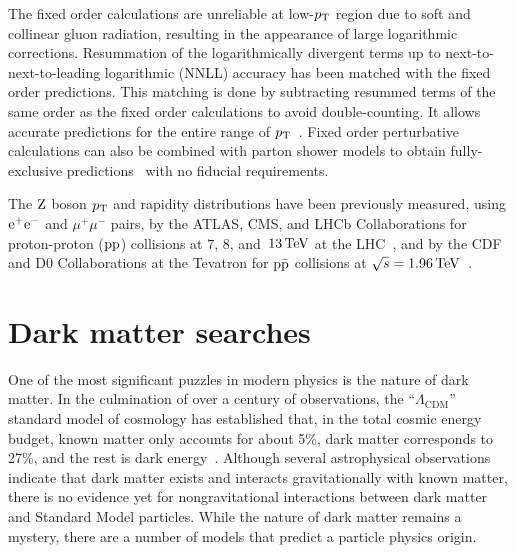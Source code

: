 The fixed order calculations are unreliable at low-$p_{\mathrm{T}}$ region due to soft 
and collinear gluon radiation, resulting in the appearance of large logarithmic 
corrections.
Resummation of the logarithmically divergent terms up to next-to-next-to-leading logarithmic (NNLL) accuracy has been matched with the fixed order predictions.
This matching is done by subtracting resummed terms of the same order as the fixed order calculations to avoid double-counting.
It allows accurate predictions for the entire range of $p_{\mathrm{T}}$~\cite{Balazs:1995nz,Catani:2015vma}.
Fixed order perturbative calculations can also be combined with parton shower models to obtain 
fully-exclusive predictions~\cite{MCatNLO,Nason:2004rx,Frixione:2002ik,Alioli:2010xd} with
no fiducial requirements.      

The $\mathrm{Z}$ boson $p_{\mathrm{T}}$ and rapidity distributions have been previously 
measured, using $\mathrm{e}^+\mathrm{e}^-$ and $\mu^+\mu^-$ pairs, by the ATLAS, CMS, and 
LHCb Collaborations for proton-proton ($\mathrm{p}\mathrm{p}$) collisions at $7$, $8$, 
and~$13\,\text{Te\hspace{-.08em}V}$ at the LHC~\cite{ATLAS_ZpT7TeV,ATLAS_ZptEta7TeV,Aad:2015auj,Aaboud:2016btc,Sirunyan:2018owv,CMS_ZpT7TeV,CMS_ZpT8TeV,CMS:2014jea,Khachatryan:2016nbe,LHCb_WZ7TeV,LHCb_Zee7TeV,LHCb_ZpT7TeV,LHCb_WZ8TeV,Aaij:2016mgv}, 
and by the CDF and D0 Collaborations at the Tevatron for $\mathrm{p}\bar{\mathrm{p}}$ 
collisions at $\sqrt{s} = 1.96\,\text{Te\hspace{-.08em}V}$~\cite{Affolder:1999jh,Abbott:1999yd,TevatronWZ:D0PhysRevLett2008_100,TevatronWZ:D0PhysLettB2010_693,TevatronWZ:D0PhysRevLett2011_106}. 

\section{Dark matter searches}

One of the most significant puzzles in modern physics is the nature of dark matter.
In the culmination of over a century of observations, the ``$\Lambda_{\mathrm{CDM}}$'' standard model of cosmology
has established that, in the total cosmic energy budget,
known matter only accounts for about 5\%, dark matter corresponds to 27\%, and the rest is dark energy~\cite{Hinshaw_2013}.
Although several astrophysical observations indicate that dark matter exists and interacts gravitationally with known matter,
there is no evidence yet for nongravitational interactions between dark matter and Standard Model particles.
While the nature of dark matter remains a mystery, there are a number of models that predict a particle physics origin. 


